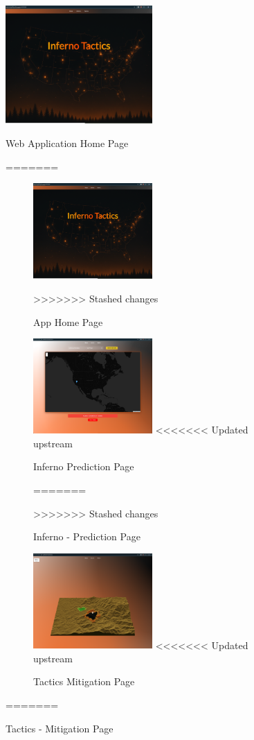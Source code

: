 \documentclass[conference]{IEEEtran}
\begin{document}
\begin{figure}[H]
    \centering
    \includegraphics[width=0.5\textwidth]{home.png}
    \caption{Web Application Home Page}
=======
\begin{figure}[H]
    \centering
    \includegraphics[width=0.5\textwidth]{home.png}
    \caption{App Home Page}
>>>>>>> Stashed changes
    \end{figure}

    \begin{figure}[H]
        \centering
        \includegraphics[width=0.5\textwidth]{inferno.png}
<<<<<<< Updated upstream
        \caption{Inferno Prediction Page}
=======
        \caption{Inferno - Prediction Page}
>>>>>>> Stashed changes
        \end{figure}

        \begin{figure}[H]
            \centering
            \includegraphics[width=0.5\textwidth]{tactix.png}
<<<<<<< Updated upstream
            \caption{Tactics Mitigation Page}
            \end{figure}
=======
            \caption{Tactics - Mitigation Page}
            \end{figure}
\end{document}
